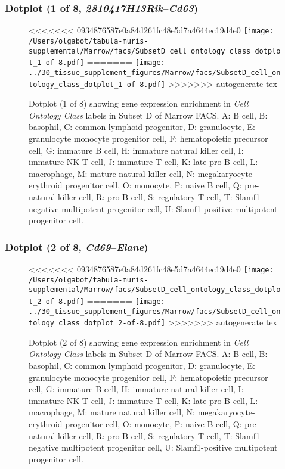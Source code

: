 \clearpage

\subsubsection{Dotplot (1 of 8, \emph{2810417H13Rik}--\emph{Cd63})}
\begin{figure}[h]
\centering
<<<<<<< 0934876587e0a84d261fc48e5d7a4644ec19d4e0
\texttt{[image: /Users/olgabot/tabula-muris-supplemental/Marrow/facs/SubsetD\_cell\_ontology\_class\_dotplot\_1-of-8.pdf]}
=======
\texttt{[image: ../30\_tissue\_supplement\_figures/Marrow/facs/SubsetD\_cell\_ontology\_class\_dotplot\_1-of-8.pdf]}
>>>>>>> autogenerate tex

\caption{ Dotplot (1 of 8)  showing gene expression enrichment in \emph{Cell Ontology Class} labels in Subset D of Marrow FACS. A: B cell, B: basophil, C: common lymphoid progenitor, D: granulocyte, E: granulocyte monocyte progenitor cell, F: hematopoietic precursor cell, G: immature B cell, H: immature natural killer cell, I: immature NK T cell, J: immature T cell, K: late pro-B cell, L: macrophage, M: mature natural killer cell, N: megakaryocyte-erythroid progenitor cell, O: monocyte, P: naive B cell, Q: pre-natural killer cell, R: pro-B cell, S: regulatory T cell, T: Slamf1-negative multipotent progenitor cell, U: Slamf1-positive multipotent progenitor cell.}
\end{figure}


\clearpage

\subsubsection{Dotplot (2 of 8, \emph{Cd69}--\emph{Elane})}
\begin{figure}[h]
\centering
<<<<<<< 0934876587e0a84d261fc48e5d7a4644ec19d4e0
\texttt{[image: /Users/olgabot/tabula-muris-supplemental/Marrow/facs/SubsetD\_cell\_ontology\_class\_dotplot\_2-of-8.pdf]}
=======
\texttt{[image: ../30\_tissue\_supplement\_figures/Marrow/facs/SubsetD\_cell\_ontology\_class\_dotplot\_2-of-8.pdf]}
>>>>>>> autogenerate tex

\caption{ Dotplot (2 of 8)  showing gene expression enrichment in \emph{Cell Ontology Class} labels in Subset D of Marrow FACS. A: B cell, B: basophil, C: common lymphoid progenitor, D: granulocyte, E: granulocyte monocyte progenitor cell, F: hematopoietic precursor cell, G: immature B cell, H: immature natural killer cell, I: immature NK T cell, J: immature T cell, K: late pro-B cell, L: macrophage, M: mature natural killer cell, N: megakaryocyte-erythroid progenitor cell, O: monocyte, P: naive B cell, Q: pre-natural killer cell, R: pro-B cell, S: regulatory T cell, T: Slamf1-negative multipotent progenitor cell, U: Slamf1-positive multipotent progenitor cell.}
\end{figure}


